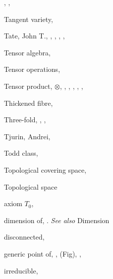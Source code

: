 {{\noindent\hspace*{15.0bp}, , \par
\noindent\hspace*{0.0bp}Tangent variety, \par
\noindent\hspace*{0.0bp}Tate, John T., , , , , \par
\noindent\hspace*{0.0bp}Tensor algebra, \par
\noindent\hspace*{0.0bp}Tensor operations, \par
\noindent\hspace*{0.0bp}Tensor product, $\otimes$, , , , , , \par
\noindent\hspace*{0.0bp}Thickened fibre, \par
\noindent\hspace*{0.0bp}Three-fold, , , \par
\noindent\hspace*{0.0bp}Tjurin, Andrei, \par
\noindent\hspace*{0.0bp}Todd class, \par
\noindent\hspace*{0.0bp}Topological covering space, \par
\noindent\hspace*{0.0bp}Topological space\par
\noindent\hspace*{7.5bp}axiom $T_0$, \par
\noindent\hspace*{7.5bp}dimension of, . \emph{See also} Dimension\par
\noindent\hspace*{7.5bp}disconnected, \par
\noindent\hspace*{7.5bp}generic point of, ,  (Fig), , \par
\noindent\hspace*{7.5bp}irreducible, \par
}}
